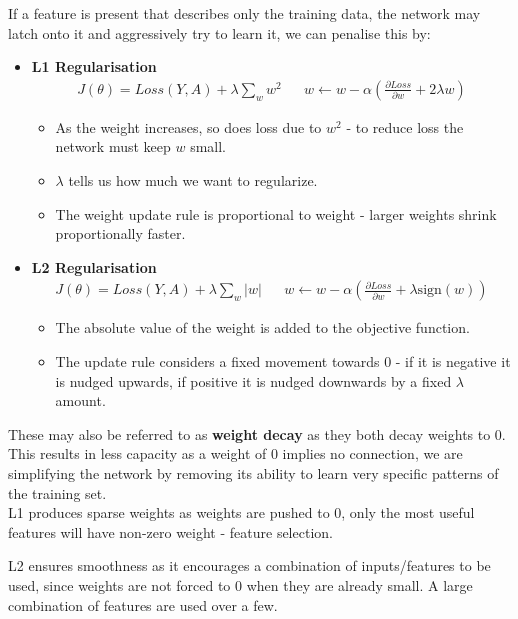 \documentclass[11pt]{article}
\begin{document}
If a feature is present that describes only the training data, the network may latch onto it and aggressively try to learn it, we can penalise this by:
\begin{itemize}
  \item \textbf{L1 Regularisation}
    \begin{align*}
      J(\theta) = Loss(Y, A) + \lambda \sum_w w^2 &&
      w \leftarrow w - \alpha \left( \frac{\partial Loss}{\partial w} + 2 \lambda w \right)
    \end{align*}
    \begin{itemize}
      \item As the weight increases, so does loss due to $w^2$ - to reduce loss the network must keep $w$ small.
      \item $\lambda$ tells us how much we want to regularize.
      \item The weight update rule is proportional to weight - larger weights shrink proportionally faster.
    \end{itemize}
  \item \textbf{L2 Regularisation}
    \begin{align*}
      J(\theta) = Loss(Y, A) + \lambda \sum_w \lvert w \rvert &&
      w \leftarrow w - \alpha \left( \frac{\partial Loss}{\partial w} + \lambda \text{sign}(w) \right)
    \end{align*}
    \begin{itemize}
      \item The absolute value of the weight is added to the objective function.
      \item The update rule considers a fixed movement towards 0 - if it is negative it is nudged upwards, if positive it is nudged downwards by a fixed $\lambda$ amount.
    \end{itemize}
\end{itemize}
These may also be referred to as \textbf{weight decay} as they both decay weights to 0.
This results in less capacity as a weight of 0 implies no connection, we are simplifying the network by removing its ability to learn very specific patterns of the training set. \\

L1 produces sparse weights as weights are pushed to 0, only the most useful features will have non-zero weight - feature selection.

L2 ensures smoothness as it encourages a combination of inputs/features to be used, since weights are not forced to 0 when they are already small.
A large combination of features are used over a few.
\end{document}
